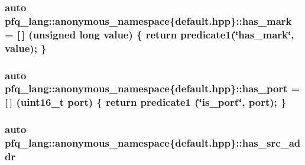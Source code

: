\hypertarget{namespacepfq__lang_1_1anonymous__namespace_02default_8hpp_03_a0f9dc3f39bf9793e766b6312718483f1}{
\subsubsection[{has\-\_\-mark}]{\setlength{\rightskip}{0pt plus 5cm}auto pfq\-\_\-lang\-::anonymous\-\_\-namespace\{default.\-hpp\}\-::has\-\_\-mark = \mbox{[}$\,$\mbox{]} (unsigned long value) \{ return {\bf predicate1}(\char`\"{}has\-\_\-mark\char`\"{}, value); \}}}\label{namespacepfq__lang_1_1anonymous__namespace_02default_8hpp_03_a0f9dc3f39bf9793e766b6312718483f1}
\hypertarget{namespacepfq__lang_1_1anonymous__namespace_02default_8hpp_03_ad2840696177c5f4f6f2072bcaae7407e}{
\subsubsection[{has\-\_\-port}]{\setlength{\rightskip}{0pt plus 5cm}auto pfq\-\_\-lang\-::anonymous\-\_\-namespace\{default.\-hpp\}\-::has\-\_\-port = \mbox{[}$\,$\mbox{]} (uint16\-\_\-t {\bf port}) \{ return {\bf predicate1} (\char`\"{}is\-\_\-port\char`\"{}, port); \}}}\label{namespacepfq__lang_1_1anonymous__namespace_02default_8hpp_03_ad2840696177c5f4f6f2072bcaae7407e}
\hypertarget{namespacepfq__lang_1_1anonymous__namespace_02default_8hpp_03_aabc75799de679df702f4179ead82114c}{
\subsubsection[{has\-\_\-src\-\_\-addr}]{\setlength{\rightskip}{0pt plus 5cm}auto pfq\-\_\-lang\-::anonymous\-\_\-namespace\{default.\-hpp\}\-::has\-\_\-src\-\_\-addr}}\label{namespacepfq__lang_1_1anonymous__namespace_02default_8hpp_03_aabc75799de679df702f4179ead82114c}
